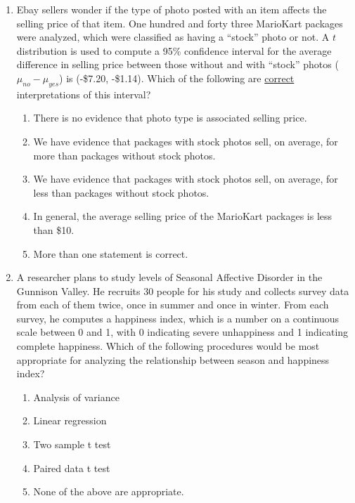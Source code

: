 \documentclass[12pt,fullpage]{amsart}
\begin{document}

\begin{enumerate}

 \item
Ebay sellers wonder if the type of photo posted with an item affects the selling price of that item.  One hundred and forty three MarioKart packages were analyzed, which were classified as having a ``stock'' photo or not.  A $t$ distribution is used to compute a 95\% confidence interval for the average difference in selling price between those without and with ``stock'' photos ($\mu_{no}-\mu_{yes}$) is (-\$7.20, -\$1.14).  Which of the following are \underline{correct} interpretations of this interval?
\begin{enumerate}
    \item
    There is no evidence that photo type is associated selling price.
    \item
    We have evidence that packages with stock photos sell, on average, for more than packages without stock photos.
    \item
    We have evidence that packages with stock photos sell, on average, for less than packages without stock photos.
    \item
    In general, the average selling price of the MarioKart packages is less than \$10.
    \item
    More than one statement is correct.  
\end{enumerate}

\vfill

\item A researcher plans to study levels of Seasonal Affective Disorder in the Gunnison Valley. He recruits 30 people for his study and collects survey data from each of them twice, once in summer and once in winter. From each survey, he computes a happiness index, which is a number on a continuous scale between 0 and 1, with 0 indicating severe unhappiness and 1 indicating complete happiness. Which of the following procedures would be most appropriate for analyzing the relationship between season and happiness index?

  \begin{enumerate}
  \item Analysis of variance
  \item Linear regression
  \item Two sample t test
  \item Paired data t test
    \item None of the above are appropriate.
  \end{enumerate}


\end{enumerate}
\end{document}

